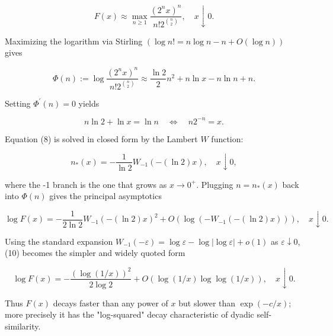 \documentclass[10pt]{article}
\begin{document}
\begin{equation*}
F(x) \approx \max _{n \geq 1} \frac{\left(2^{n} x\right)^{n}}{n!2^{\binom{n}{2}}}, \quad x \downarrow 0 . \tag{7}
\end{equation*}


Maximizing the logarithm via Stirling $(\log n!=n \log n-n+O(\log n))$ gives

$$
\Phi(n):=\log \frac{\left(2^{n} x\right)^{n}}{n!2^{\binom{n}{2}}} \approx \frac{\ln 2}{2} n^{2}+n \ln x-n \ln n+n .
$$

Setting $\Phi^{\prime}(n)=0$ yields


\begin{equation*}
n \ln 2+\ln x=\ln n \quad \Leftrightarrow \quad n 2^{-n}=x . \tag{8}
\end{equation*}


Equation (8) is solved in closed form by the Lambert $W$ function:


\begin{equation*}
n_{*}(x)=-\frac{1}{\ln 2} W_{-1}(-(\ln 2) x), \quad x \downarrow 0, \tag{9}
\end{equation*}


where the -1 branch is the one that grows as $x \rightarrow 0^{+}$. Plugging $n=n_{*}(x)$ back into $\Phi(n)$ gives the principal asymptotics


\begin{equation*}
\log F(x)=-\frac{1}{2 \ln 2} W_{-1}(-(\ln 2) x)^{2}+O\left(\log \left(-W_{-1}(-(\ln 2) x)\right)\right), \quad x \downarrow 0 . \tag{10}
\end{equation*}


Using the standard expansion $W_{-1}(-\varepsilon)=\log \varepsilon-\log |\log \varepsilon|+o(1)$ as $\varepsilon \downarrow 0$, (10) becomes the simpler and widely quoted form


\begin{equation*}
\log F(x)=-\frac{(\log (1 / x))^{2}}{2 \log 2}+O(\log (1 / x) \log \log (1 / x)), \quad x \downarrow 0 . \tag{11}
\end{equation*}


Thus $F(x)$ decays faster than any power of $x$ but slower than $\exp (-c / x)$; more precisely it has the "log-squared" decay characteristic of dyadic self-similarity.
\end{document}
